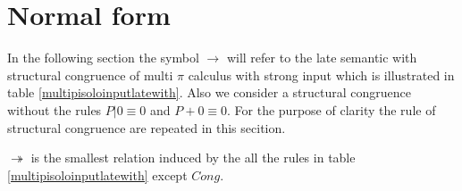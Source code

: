 % 
% 

\section{Normal form}

In the following section the symbol $\rightarrow$ will refer to the late semantic with structural congruence of multi $\pi$ calculus with strong input which is illustrated in table \ref{multipisoloinputlatewith}. Also we consider a structural congruence without the rules $P|0\equiv 0$ and $P+0\equiv 0$. For the purpose of clarity the rule of structural congruence are repeated in this secition.

\begin{definition}
  $\twoheadrightarrow$ is the smallest relation induced by the all the rules in table \ref{multipisoloinputlatewith} except $Cong$. 
\end{definition}

